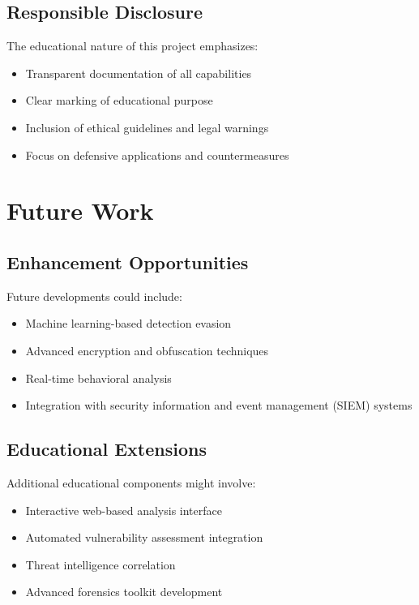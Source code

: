 \documentclass[12pt,a4paper]{article}
\begin{document}
\subsection{Responsible Disclosure}

The educational nature of this project emphasizes:

\begin{itemize}
    \item Transparent documentation of all capabilities
    \item Clear marking of educational purpose
    \item Inclusion of ethical guidelines and legal warnings
    \item Focus on defensive applications and countermeasures
\end{itemize}

\section{Future Work}

\subsection{Enhancement Opportunities}

Future developments could include:

\begin{itemize}
    \item Machine learning-based detection evasion
    \item Advanced encryption and obfuscation techniques
    \item Real-time behavioral analysis
    \item Integration with security information and event management (SIEM) systems
\end{itemize}

\subsection{Educational Extensions}

Additional educational components might involve:

\begin{itemize}
    \item Interactive web-based analysis interface
    \item Automated vulnerability assessment integration
    \item Threat intelligence correlation
    \item Advanced forensics toolkit development
\end{itemize}
\end{document}
